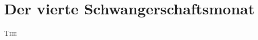\chapter*{Der vierte Schwangerschaftsmonat}

\lettrine[lines=2, loversize=0.3, lraise=0]{\initfamily T}{he}

